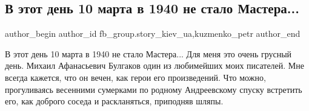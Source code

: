  
 
 
 
 
 
\subsection{В этот день 10 марта в 1940 не стало Мастера...}
\label{sec:10_03_2021.fb.fb_group.story_kiev_ua.1.bulgakov_smert}
 
\ifcmt
 author_begin
   author_id fb_group.story_kiev_ua,kuzmenko_petr
 author_end
\fi


В этот день 10 марта в 1940 не стало Мастера... Для меня это очень грусный
день. Михаил Афанасьевич Булгаков один из любимейших моих писателей. Мне всегда
кажется, что он вечен, как герои его произведений. Что можно, прогуливаясь
весенними сумерками по родному Андреевскому спуску встретить его, как доброго
соседа и раскланяться, приподняв шляпы.

